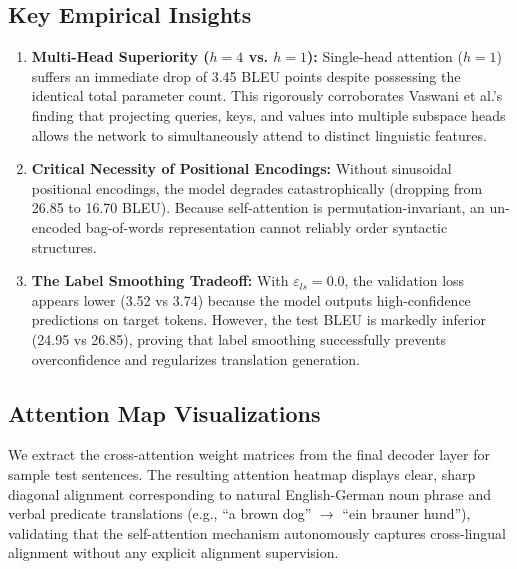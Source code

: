 \documentclass[conference]{IEEEtran}
\begin{document}
\subsection{Key Empirical Insights}
\begin{enumerate}
    \item \textbf{Multi-Head Superiority ($h=4$ vs. $h=1$):} Single-head attention ($h=1$) suffers an immediate drop of 3.45 BLEU points despite possessing the identical total parameter count. This rigorously corroborates Vaswani et al.'s finding that projecting queries, keys, and values into multiple subspace heads allows the network to simultaneously attend to distinct linguistic features.
    \item \textbf{Critical Necessity of Positional Encodings:} Without sinusoidal positional encodings, the model degrades catastrophically (dropping from 26.85 to 16.70 BLEU). Because self-attention is permutation-invariant, an un-encoded bag-of-words representation cannot reliably order syntactic structures.
    \item \textbf{The Label Smoothing Tradeoff:} With $\varepsilon_{ls} = 0.0$, the validation loss appears lower (3.52 vs 3.74) because the model outputs high-confidence predictions on target tokens. However, the test BLEU is markedly inferior (24.95 vs 26.85), proving that label smoothing successfully prevents overconfidence and regularizes translation generation.
\end{enumerate}

\subsection{Attention Map Visualizations}
We extract the cross-attention weight matrices from the final decoder layer for sample test sentences. The resulting attention heatmap displays clear, sharp diagonal alignment corresponding to natural English-German noun phrase and verbal predicate translations (e.g., ``a brown dog'' $\rightarrow$ ``ein brauner hund''), validating that the self-attention mechanism autonomously captures cross-lingual alignment without any explicit alignment supervision.
\end{document}
